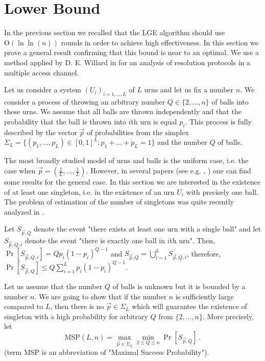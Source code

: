 \documentclass[proceedings]{dmtcs}
\newcommand{\BigO}[1]{\mathrm{O}\left(#1\right)}
\newcommand{\MSP}[2]{\mathrm{MSP}\left(#1,#2\right)}
\begin{document}
\section{Lower Bound}
\label{sec:lowerbound}

In the previous section we recalled that the LGE algorithm should use $\BigO{\ln\ln(n)}$ rounds in order to achieve high
effectiveness. In this section we prove a general result confirming that this bound is near to an optimal.
We use a method applied by D. E. Willard in \cite{Willard:1986} for an analysis of resolution protocols
in a multiple access channel.

Let us consider  a system $(U_i)_{i=1,\ldots,L}$ of $L$ urns and let us fix a number $n$.
We consider a process of throwing an arbitrary number $Q \in \{2,\ldots,n\}$ of balls into 
these urns. We assume that all balls are thrown independently and that the probability that
the ball is thrown into $i$th urn is equal $p_i$.
This process is fully described by the vector $\vec{p}$ of probabilities from the simplex
$\Sigma_L = \{(p_1,\ldots,p_L) \in [0,1]^L: p_1+\ldots+p_L = 1\}$ and the number $Q$ of balls.

The most broadly studied model of urns and balls is the uniform case, i.e. the case when 
$\vec{p} = (\frac1L,\ldots,\frac1L)$. However, in several papers 
(see e.g. \cite{Flajolet:1992}, \cite{boneh1997coupon}) one can find some results for the general case.
In this section we are interested in the existence of at least one singleton, i.e. in the existence of an urn $U_i$
with precisely one ball. The problem of estimation of the number of singletons was quite recently analyzed in 
\cite{EJP699}.


Let  $S_{\vec{p},Q}$ denote the event "there exists at least one urn with a single ball"
and let $S_{\vec{p},Q,i}$ denote the event "there is exactly one ball in $i$th urn". Then, 
$\Pr[S_{\vec{p},Q,i}] = Q p_i (1-p_i)^{Q-1}$ and $S_{\vec{p},Q} = \bigcup_{i=1}^{L} S_{\vec{p},Q,i}$,
therefore,
$\Pr[S_{\vec{p},Q}] \leq Q \sum_{i=1}^{L} p_i (1-p_i)^{Q-1}$.

Let us assume that the number $Q$ of balls is unknown but it is bounded by a number $n$.
We are going to show that if the number $n$ is sufficiently large compared to $L$, then
there is no $\vec{p} \in \Sigma_L$ which will guarantee the existence of singleton with a high probability 
for arbitrary $Q$ from $\{2,\ldots,n\}$.
More precisely, let
$$
  \MSP{L}{n} = \max_{\vec{p}\in\Sigma_L} \min_{2\leq Q \leq n} \Pr[S_{\vec{p},Q}] ~.
$$
(term MSP is an abbreviation of "Maximal Success Probability").
 
\end{document}
